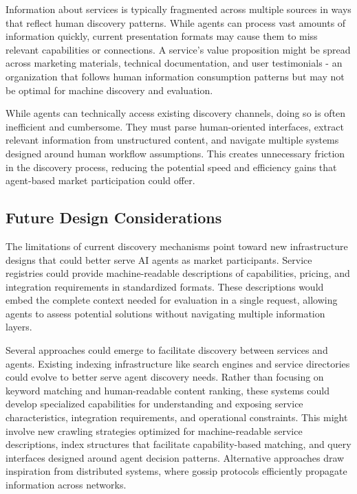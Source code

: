 \documentclass{article}
\begin{document}
Information about services is typically fragmented across multiple sources in ways that reflect human discovery patterns. While agents can process vast amounts of information quickly, current presentation formats may cause them to miss relevant capabilities or connections. A service's value proposition might be spread across marketing materials, technical documentation, and user testimonials - an organization that follows human information consumption patterns but may not be optimal for machine discovery and evaluation.

While agents can technically access existing discovery channels, doing so is often inefficient and cumbersome. They must parse human-oriented interfaces, extract relevant information from unstructured content, and navigate multiple systems designed around human workflow assumptions. This creates unnecessary friction in the discovery process, reducing the potential speed and efficiency gains that agent-based market participation could offer.

\subsection{Future Design Considerations}
\label{subsec:discovery_future}
The limitations of current discovery mechanisms point toward new infrastructure designs that could better serve AI agents as market participants. Service registries could provide machine-readable descriptions of capabilities, pricing, and integration requirements in standardized formats. These descriptions would embed the complete context needed for evaluation in a single request, allowing agents to assess potential solutions without navigating multiple information layers.

Several approaches could emerge to facilitate discovery between services and agents. Existing indexing infrastructure like search engines and service directories could evolve to better serve agent discovery needs. Rather than focusing on keyword matching and human-readable content ranking, these systems could develop specialized capabilities for understanding and exposing service characteristics, integration requirements, and operational constraints. This might involve new crawling strategies optimized for machine-readable service descriptions, index structures that facilitate capability-based matching, and query interfaces designed around agent decision patterns. Alternative approaches draw inspiration from distributed systems, where gossip protocols efficiently propagate information across networks.
\end{document}
